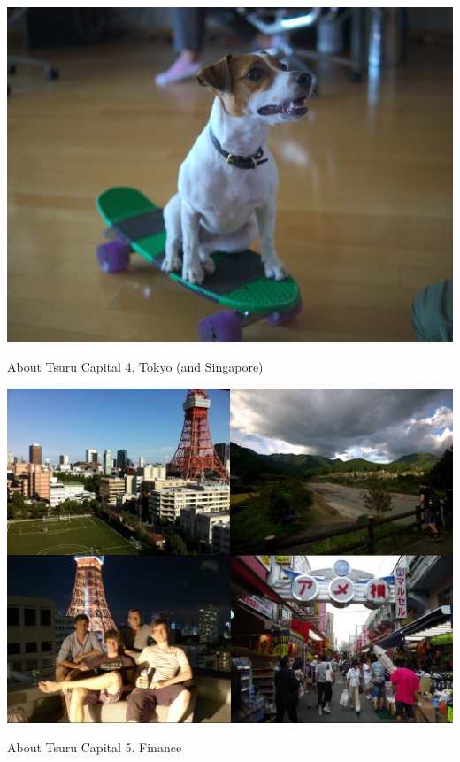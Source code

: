 \documentclass[20pt]{beamer}
\begin{document}
\begin{frame}[plain]
    \includegraphics[width=\textwidth]{images/teito-skateboard.jpg}
\end{frame}

\begin{frame}{About Tsuru Capital}
    4. Tokyo \small{(and Singapore)}
\end{frame}

\begin{frame}[plain]
    \includegraphics[width=\textwidth]{images/random-pics.jpg}
\end{frame}

\begin{frame}{About Tsuru Capital}
    5. Finance
\end{frame}
\end{document}
